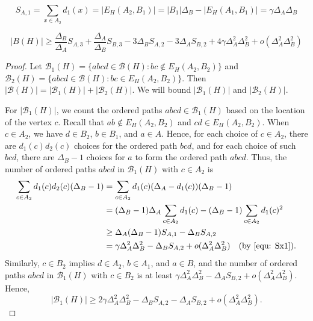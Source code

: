 \documentclass[10pt,a4paper]{amsart}
\newcommand{\bb}{\mathcal{B}}
\begin{document}
\begin{equation}\label{equ: Sx1}
    S_{A,1} =\sum_{x\in A_2}d_1(x)=|E_H(A_2,B_1)|=|B_1|\Delta_B-|E_H(A_1,B_1)|=\gamma \Delta_A\Delta_B
\end{equation}   

\begin{lemma}\label{clm BH} 
\[
  |B(H)| \ge    \frac{\Delta_B}{\Delta_A}S_{A,3}+\frac{\Delta_A}{\Delta_B} S_{B,3}- 3\Delta_B S_{A,2} -3\Delta_A S_{B,2} + 4\gamma \Delta_A^2\Delta_B^2
          +o(\Delta_A^2\Delta_B^2)   \]
\end{lemma}

\begin{proof} 
 Let $\bb_1(H)=\big\{abcd\in \bb(H): bc\notin E_H(A_2,B_2)\big\}$ and $\bb_2(H)=\big\{abcd\in \bb(H): bc\in E_H(A_2,B_2)\big\}$.  Then $|\bb(H)|=|\bb_1(H)|+|\bb_2(H)|$. We will bound $|\bb_1(H)|$ and $|\bb_2(H)|$. 

For $|\bb_1(H)|$, we count the ordered paths $abcd \in \mathcal{B}_1(H)$ based on the location of the vertex $c$. Recall that $ab\notin E_H(A_2,B_2)$ and $cd \in E_H(A_2, B_2)$. When $c \in A_2$, we have $d\in B_2$, $b\in B_1$, and $a\in A$. Hence, for each choice of $c\in A_2$, there are $d_1(c)d_2(c)$ choices for the ordered path $bcd$, and for each choice of such $bcd$, there are $\Delta_B -1$ choices for $a$ to form the ordered path $abcd$. Thus, the number of ordered paths $abcd$ in $\bb_1(H)$ with $c\in A_2$ is 
\begin{align*}
    \sum_{c\in A_2}d_1(c)d_2(c)(\Delta_B -1)
    &= \sum_{c\in A_2}d_1(c)(\Delta_A-d_1(c))(\Delta_B -1)\\
    &= (\Delta_B-1)\Delta_A  \sum_{c\in A_2}d_1(c)-(\Delta_B-1) \sum_{c\in A_2}d_1(c)^2\\
    &\ge  \Delta_A (\Delta_B-1) S_{A,1}- \Delta_B S_{A,2} \\
    &=%
    \gamma\Delta_A^2 \Delta_B^2  - \Delta_B S_{A,2} +o(\Delta_A^2 \Delta_B^2) \quad (\mbox{by } \eqref{equ: Sx1}).
\end{align*} 
Similarly, $c \in B_2$ implies $d\in A_2$, $b\in A_1$, and $a\in B$, and  the number of ordered paths $abcd$ in $\bb_1(H)$ with $c\in B_2$ is at least
 $\gamma\Delta_A^2 \Delta_B^2- \Delta_A S_{B,2}+o(\Delta_A^2 \Delta_B^2)$. Hence, 
\[
    |\bb_1(H)|\ge 2\gamma\Delta_A^2 \Delta_B^2- \Delta_B S_{A,2}- \Delta_A S_{B,2}+o(\Delta_A^2 \Delta_B^2).
\] 
 

\end{proof}
\end{document}
